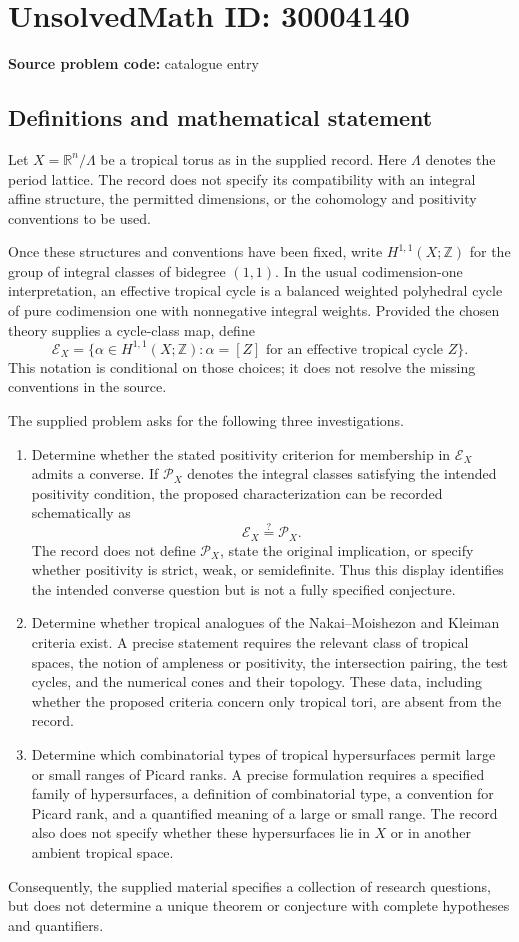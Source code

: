 \documentclass[11pt]{article}
\newcommand{\Z}{\mathbb{Z}}
\newcommand{\R}{\mathbb{R}}
\begin{document}
\section*{UnsolvedMath ID: 30004140}
\textbf{Source problem code:} catalogue entry
\subsection{Definitions and mathematical statement}
Let \(X=\R^n/\Lambda\) be a tropical torus as in the supplied record. Here \(\Lambda\) denotes the period lattice. The record does not specify its compatibility with an integral affine structure, the permitted dimensions, or the cohomology and positivity conventions to be used.

Once these structures and conventions have been fixed, write \(H^{1,1}(X;\Z)\) for the group of integral classes of bidegree \((1,1)\). In the usual codimension-one interpretation, an effective tropical cycle is a balanced weighted polyhedral cycle of pure codimension one with nonnegative integral weights. Provided the chosen theory supplies a cycle-class map, define
\[
\mathcal E_X=\bigl\{\alpha\in H^{1,1}(X;\Z):\alpha=[Z]\text{ for an effective tropical cycle }Z\bigr\}.
\]
This notation is conditional on those choices; it does not resolve the missing conventions in the source.

The supplied problem asks for the following three investigations.
\begin{enumerate}
\item Determine whether the stated positivity criterion for membership in \(\mathcal E_X\) admits a converse. If \(\mathcal P_X\) denotes the integral classes satisfying the intended positivity condition, the proposed characterization can be recorded schematically as
\[
\mathcal E_X\stackrel{?}{=}\mathcal P_X.
\]
The record does not define \(\mathcal P_X\), state the original implication, or specify whether positivity is strict, weak, or semidefinite. Thus this display identifies the intended converse question but is not a fully specified conjecture.
\item Determine whether tropical analogues of the Nakai--Moishezon and Kleiman criteria exist. A precise statement requires the relevant class of tropical spaces, the notion of ampleness or positivity, the intersection pairing, the test cycles, and the numerical cones and their topology. These data, including whether the proposed criteria concern only tropical tori, are absent from the record.
\item Determine which combinatorial types of tropical hypersurfaces permit large or small ranges of Picard ranks. A precise formulation requires a specified family of hypersurfaces, a definition of combinatorial type, a convention for Picard rank, and a quantified meaning of a large or small range. The record also does not specify whether these hypersurfaces lie in \(X\) or in another ambient tropical space.
\end{enumerate}
Consequently, the supplied material specifies a collection of research questions, but does not determine a unique theorem or conjecture with complete hypotheses and quantifiers.
\end{document}
